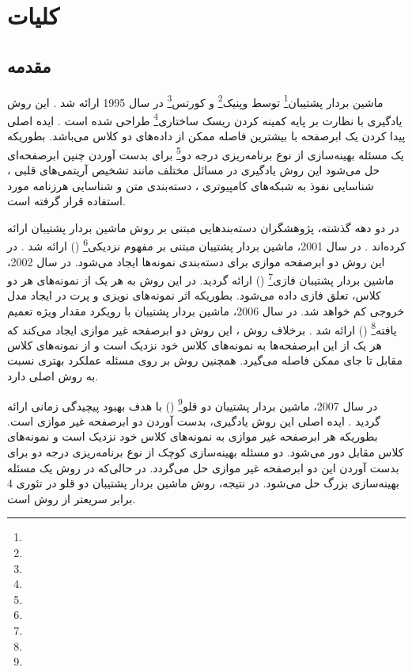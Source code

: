 \chapter{کلیات}
\section{مقدمه}

ماشین بردار پشتیبان\footnote{} توسط وپنیک\footnote{} و کورتس\footnote{} در سال 1995 ارائه شد \cite{vapnik1995}. این روش یادگیری با نظارت بر پایه کمینه کردن ریسک ساختاری\footnote{} طراحی شده است \cite{vapnik1998}. ایده اصلی  پیدا کردن یک ابرصفحه با بیشترین فاصله ممکن از داده‌های دو کلاس می‌باشد. بطوریکه یک مسئله  بهینه‌سازی از نوع برنامه‌ریزی درجه دو\footnote{} برای بدست آوردن چنین ابرصفحه‌ای حل می‌شود این روش یادگیری در مسائل مختلف مانند تشخیص آریتمی‌های قلبی \cite{nasiri2009}، شناسایی نفوذ به شبکه‌های کامپیوتری \cite{raman2017}، دسته‌بندی متن\cite{lee2012} و شناسایی هرزنامه \cite{zoubi2018} مورد استفاده قرار گرفته است.

در دو دهه گذشته، پژوهشگران دسته‌بندهایی مبتنی بر روش ماشین بردار پشتیبان ارائه کرده‌اند \cite{nayak2015}. در سال 2001، ماشین بردار پشتیبان مبتنی بر مفهوم نزدیکی\footnote{}  () ارائه شد \cite{mang2001}. در این روش دو ابرصفحه موازی برای دسته‌بندی نمونه‌ها ایجاد می‌شود. در سال 2002، ماشین بردار پشتیبان فازی\footnote{}  () \cite{lin2002} ارائه گردید. در این روش به هر یک از نمونه‌های هر دو کلاس، تعلق فازی داده می‌شود. بطوریکه اثر نمونه‌های نویزی و پرت در ایجاد مدل خروجی کم خواهد شد. در سال 2006، ماشین بردار پشتیبان با رویکرد مقدار ویژه تعمیم یافته\footnote{}  () ارائه شد \cite{mang2006}. برخلاف روش ، این روش دو ابرصفحه غیر موازی ایجاد می‌کند که هر یک از این ابرصفحه‌ها به نمونه‌های کلاس خود نزدیک است و از نمونه‌های کلاس مقابل تا جای ممکن فاصله می‌گیرد. همچنین روش  بر روی مسئله  عملکرد بهتری نسبت به روش  اصلی دارد.

در سال 2007، ماشین بردار پشتیبان دو قلو\footnote{}  () با هدف بهبود پیچیدگی زمانی  ارائه گردید \cite{jayadeva2007}. ایده اصلی این روش یادگیری، بدست آوردن دو ابرصفحه غیر موازی است. بطوریکه هر ابرصفحه غیر موازی به نمونه‌های کلاس خود نزدیک است و نمونه‌های کلاس مقابل دور می‌شود. دو مسئله بهینه‌سازی کوچک از نوع برنامه‌ریزی درجه دو برای بدست آوردن این دو ابرصفحه غیر موازی حل می‌گردد. در حالی‌که در روش  یک مسئله بهینه‌سازی بزرگ حل می‌شود. در نتیجه، روش ماشین بردار پشتیبان دو قلو در تئوری 4 برابر سریعتر از روش  است.

